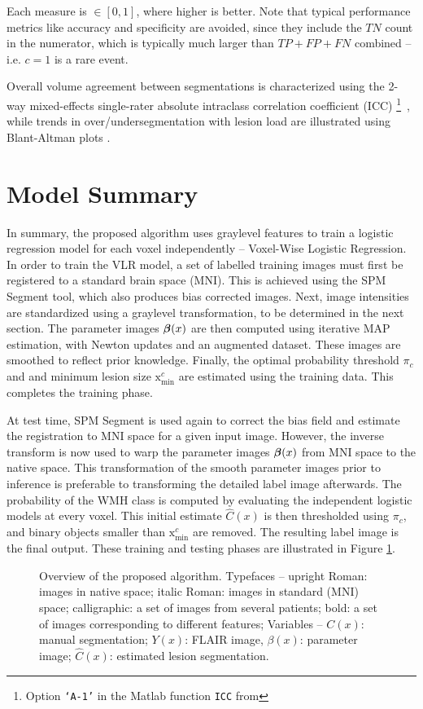 Each measure is $\in [0,1]$, where higher is better.
Note that typical performance metrics like accuracy and specificity are avoided, since they include the $TN$ count in the numerator, which is typically much larger than $TP + FP + FN$ combined -- i.e. $c=1$ is a rare event.
\par
Overall volume agreement between segmentations is characterized using the 2-way mixed-effects single-rater absolute intraclass correlation coefficient (ICC)%
\footnote{Option \texttt{`A-1'} in the Matlab function \texttt{ICC} from }\ 
\cite{Koo2016}, while trends in over/undersegmentation with lesion load are illustrated using Blant-Altman plots \cite{Altman1983}.
\section{Model Summary}
In summary, the proposed algorithm uses graylevel features to train a logistic regression model for each voxel independently -- Voxel-Wise Logistic Regression.
In order to train the VLR model, a set of labelled training images must first be registered to a standard brain space (MNI).
This is achieved using the SPM Segment tool, which also produces bias corrected images.
Next, image intensities are standardized using a graylevel transformation, to be determined in the next section.
The parameter images $\bm{\beta}(x)$ are then computed using iterative MAP estimation, with Newton updates and an augmented dataset.
These images are smoothed to reflect prior knowledge.
Finally, the optimal probability threshold $\pi_c$ and and minimum lesion size $\mathrm{x}_{\min}^{c}$ are estimated using the training data.
This completes the training phase.
\par
At test time, SPM Segment is used again to correct the bias field and estimate the registration to MNI space for a given input image.
However, the inverse transform is now used to warp the parameter images $\bm{\beta}(x)$ from MNI space to the native space.
This transformation of the smooth parameter images prior to inference is preferable to transforming the detailed label image afterwards.
The probability of the WMH class is computed by evaluating the independent logistic models at every voxel.
This initial estimate $\hat{C}(x)$ is then thresholded using $\pi_c$, and binary objects smaller than $\mathrm{x}_{\min}^{c}$ are removed.
The resulting label image is the final output.
These training and testing phases are illustrated in Figure \ref{fig:modelsum}.
\begin{figure}
  \centering\scalebox{0.65}{}
  \caption{Overview of the proposed algorithm.
    Typefaces -- upright Roman: images in native space; italic Roman: images in standard (MNI) space; calligraphic: a set of images from several patients; bold: a set of images corresponding to different features;
    Variables -- $C(x)$: manual segmentation; $Y(x)$: FLAIR image, $\beta(x)$: parameter image; $\hat{C}(x)$: estimated lesion segmentation.}
  \label{fig:modelsum}
\end{figure}
